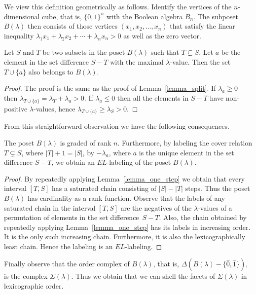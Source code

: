 \documentclass[ALCO,ThmDefs,Unicode,epreuves]{cedram}
\newcommand{\hz}{\hat{0}}
\newcommand{\ho}{\hat{1}}
\begin{document}
We view this definition geometrically as follows.
Identify the vertices of the $n$-dimensional cube, that is,
$\{0,1\}^{n}$ with the Boolean algebra $B_{n}$.
The subposet $B(\lambda)$ then consists of those
vertices $(x_{1}, x_{2}, \ldots, x_{n})$
that satisfy the linear inequality
$\lambda_{1} x_{1} + \lambda_{2} x_{2} + \cdots + \lambda_{n} x_{n} > 0$
as well as the zero vector.
\begin{lemma}
Let $S$ and $T$ be two subsets in the poset $B(\lambda)$
such that $T \subsetneq S$. Let $a$ be the element
in the set difference $S-T$ with the maximal $\lambda$-value.
Then the set $T \cup \{a\}$ also belongs to $B(\lambda)$.
\label{lemma_one_step}
\end{lemma}
\begin{proof}
The proof is the same as the proof of
Lemma~\ref{lemma_split}.
If $\lambda_{a} \geq 0$ then
$\lambda_{T \cup \{a\}}
=
\lambda_{T}
+
\lambda_{a}
> 0$.
If $\lambda_{a} \leq 0$ then
all the elements in $S-T$ have non-positive $\lambda$-values,
hence
$\lambda_{T \cup \{a\}} \geq \lambda_{S} > 0$.
\end{proof}

From this straightforward observation we have
the following consequences.
\begin{prop}
The poset $B(\lambda)$ is graded of rank $n$.
Furthermore, by labeling the cover relation
$T \subsetneq S$, where $|T|+1=|S|$, 
by $-\lambda_{a}$, where $a$ is the unique element in the set difference
$S-T$, we obtain an $EL$-labeling of the poset $B(\lambda)$.
\end{prop}
\begin{proof}
By repeatedly applying Lemma~\ref{lemma_one_step}
we obtain that every interval $[T,S]$ has
a saturated chain consisting of $|S|-|T|$ steps.
Thus the poset $B(\lambda)$ has cardinality
as a rank function.
Observe that the labels of any saturated chain in the interval $[T,S]$
are the negatives
of the $\lambda$-values 
of a permutation of elements in the set difference~$S-T$.
Also, the chain obtained
by repeatedly applying Lemma~\ref{lemma_one_step}
has its labels
in increasing order.
It is the only such increasing chain. Furthermore,
it is also the lexicographically least chain.
Hence the labeling is an $EL$-labeling.
\end{proof}

Finally observe that
the order complex of $B(\lambda)$,
that is,
$\Delta(B(\lambda) - \{\hz,\ho\})$,
is the complex $\Sigma(\lambda)$.
Thus we obtain that 
we can shell the facets of $\Sigma(\lambda)$
in lexicographic order.
\end{document}
